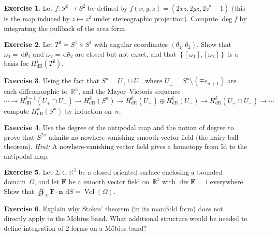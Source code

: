 \documentclass[12pt,a4paper,openany]{book}
\theoremstyle{definition}
\newtheorem{exercise}{Exercise}[chapter]
\theoremstyle{remark}
\newcommand{\R}{\mathbb{R}}
\newcommand{\Id}{\mathrm{Id}}
\newcommand{\dd}{\,\mathrm{d}}
\newcommand{\set}[1]{\left\{ #1 \right\}}
\begin{document}
\begin{exercise}\label{exo:degree-computation}
Let $f\colon S^2\to S^2$ be defined by $f(x,y,z) = (2xz, 2yz, 2z^2-1)$
(this is the map induced by $z\mapsto z^2$ under stereographic
projection).  Compute $\deg f$ by integrating the pullback of the
area form.
\end{exercise}

\begin{exercise}\label{exo:closed-not-exact-torus}
Let $T^2 = S^1\times S^1$ with angular coordinates $(\theta_1,\theta_2)$.
Show that $\omega_1 = \dd\theta_1$ and $\omega_2 = \dd\theta_2$ are
closed but not exact, and that $\set{[\omega_1],[\omega_2]}$ is a basis
for $H^1_{\mathrm{dR}}(T^2)$.
\end{exercise}

\begin{exercise}\label{exo:mayer-vietoris-hint}
Using the fact that $S^n = U_+\cup U_-$ where $U_\pm = S^n\setminus\set{\mp e_{n+1}}$
are each diffeomorphic to~$\R^n$, and the Mayer--Vietoris sequence
\[
  \cdots\to H^{k-1}_{\mathrm{dR}}(U_+\cap U_-)\to H^k_{\mathrm{dR}}(S^n)
  \to H^k_{\mathrm{dR}}(U_+)\oplus H^k_{\mathrm{dR}}(U_-)
  \to H^k_{\mathrm{dR}}(U_+\cap U_-)\to\cdots
\]
compute $H^k_{\mathrm{dR}}(S^n)$ by induction on~$n$.
\end{exercise}

\begin{exercise}\label{exo:hairy-ball}
Use the degree of the antipodal map and the notion of degree to prove
that $S^{2n}$ admits no nowhere-vanishing smooth vector field (the
hairy ball theorem).  \emph{Hint:} A nowhere-vanishing vector field
gives a homotopy from $\Id$ to the antipodal map.
\end{exercise}

\begin{exercise}\label{exo:flux-integral}
Let $\Sigma\subset\R^3$ be a closed oriented surface enclosing a
bounded domain~$\Omega$, and let $\mathbf{F}$ be a smooth vector field
on~$\R^3$ with $\operatorname{div}\mathbf{F} = 1$ everywhere.  Show
that $\oiint_\Sigma \mathbf{F}\cdot\mathbf{n}\,\dd S = \operatorname{Vol}(\Omega)$.
\end{exercise}

\begin{exercise}\label{exo:stokes-moebius}
Explain why Stokes' theorem (in its manifold form) does not directly
apply to the M\"obius band.  What additional structure would be
needed to define integration of $2$-forms on a M\"obius band?
\end{exercise}
\end{document}
